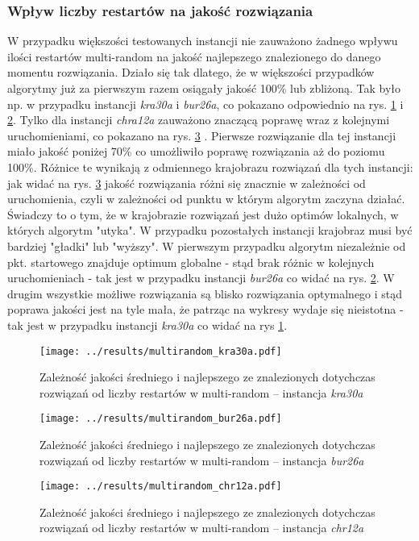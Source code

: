 \documentclass{article}
\begin{document}
		\subsubsection{Wpływ liczby restartów na jakość rozwiązania}		
			W przypadku większości testowanych instancji nie zauważono żadnego wpływu ilości restartów multi-random na jakość najlepszego znalezionego do danego momentu rozwiązania. Działo się tak dlatego, że w większości przypadków algorytmy już za pierwszym razem osiągały jakość  100\%  lub zbliżoną. Tak było np. w przypadku instancji \emph{kra30a} i \emph{bur26a}, co pokazano odpowiednio na rys. \ref{fig:mr.kra30a} i \ref{fig:mr.bur26a}. Tylko dla instancji \emph{chra12a} zauważono znaczącą poprawę wraz z kolejnymi uruchomieniami, co pokazano na rys. \ref{fig:mr.chr12a}  . Pierwsze rozwiązanie dla tej instancji miało jakość poniżej 70\% co umożliwiło poprawę rozwiązania aż do poziomu 100\%. Różnice te wynikają z odmiennego krajobrazu rozwiązań dla tych instancji: jak widać na rys. \ref{fig:mr.chr12a} jakość rozwiązania różni się znacznie w zależności od uruchomienia, czyli w zależności od punktu w którym algorytm zaczyna działać. Świadczy to o tym, że w krajobrazie rozwiązań jest dużo optimów lokalnych, w których algorytm "utyka". W przypadku pozostałych instancji krajobraz musi być bardziej "gładki" lub "wyższy". W pierwszym przypadku algorytm niezależnie od pkt. startowego znajduje optimum globalne  - stąd brak różnic w kolejnych uruchomieniach - tak jest w przypadku instancji \emph{bur26a} co widać na rys. \ref{fig:mr.bur26a}. W drugim wszystkie możliwe rozwiązania są blisko rozwiązania optymalnego i stąd poprawa jakości jest na tyle mała, że patrząc na wykresy wydaje się nieistotna - tak jest w przypadku instancji \emph{kra30a} co widać na rys \ref{fig:mr.kra30a}.

			\begin{figure}[h]
				\texttt{[image: ../results/multirandom\_kra30a.pdf]}
				\caption{Zależność jakości średniego i najlepszego ze znalezionych dotychczas rozwiązań od liczby restartów w multi-random -- instancja \emph{kra30a}\label{fig:mr.kra30a}}		
			\end{figure}
			\begin{figure}[h]
				\texttt{[image: ../results/multirandom\_bur26a.pdf]}
				\caption{Zależność jakości średniego i najlepszego ze znalezionych dotychczas rozwiązań od liczby restartów w multi-random -- instancja \emph{bur26a}\label{fig:mr.bur26a}}		
			\end{figure}
			\begin{figure}[h]
				\texttt{[image: ../results/multirandom\_chr12a.pdf]}
				\caption{Zależność jakości średniego i najlepszego ze znalezionych dotychczas rozwiązań od liczby restartów w multi-random -- instancja \emph{chr12a}\label{fig:mr.chr12a}}		
			\end{figure}
\end{document}
